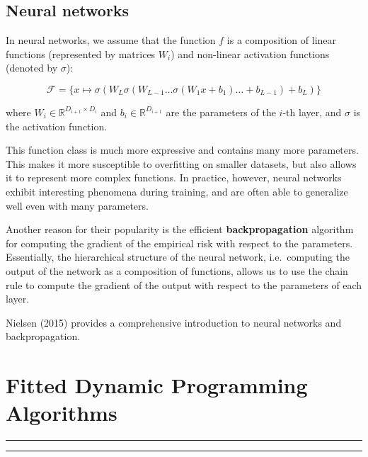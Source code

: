 \documentclass[
  letterpaper,
  DIV=11,
  numbers=noendperiod]{scrreprt}
\theoremstyle{plain}
\theoremstyle{plain}
\theoremstyle{definition}
\theoremstyle{definition}
\theoremstyle{remark}
\begin{document}
\section{Neural networks}\label{neural-networks}

In neural networks, we assume that the function \(f\) is a composition
of linear functions (represented by matrices \(W_i\)) and non-linear
activation functions (denoted by \(\sigma\)):

\[
\mathcal{F} = \{ x \mapsto \sigma(W_L \sigma(W_{L-1} \dots \sigma(W_1 x + b_1) \dots + b_{L-1}) + b_L) \}
\]

where \(W_i \in \mathbb{R}^{D_{i+1} \times D_i}\) and
\(b_i \in \mathbb{R}^{D_{i+1}}\) are the parameters of the \(i\)-th
layer, and \(\sigma\) is the activation function.

This function class is much more expressive and contains many more
parameters. This makes it more susceptible to overfitting on smaller
datasets, but also allows it to represent more complex functions. In
practice, however, neural networks exhibit interesting phenomena during
training, and are often able to generalize well even with many
parameters.

Another reason for their popularity is the efficient
\textbf{backpropagation} algorithm for computing the gradient of the
empirical risk with respect to the parameters. Essentially, the
hierarchical structure of the neural network, i.e.~computing the output
of the network as a composition of functions, allows us to use the chain
rule to compute the gradient of the output with respect to the
parameters of each layer.

Nielsen (2015) provides a comprehensive introduction to neural networks
and backpropagation.


\chapter{Fitted Dynamic Programming Algorithms}\label{sec-fitted_dp}

\begin{center}\rule{0.5\linewidth}{0.5pt}\end{center}

\begin{center}\rule{0.5\linewidth}{0.5pt}\end{center}

\providecommand{\hi}{h}
\providecommand{\hor}{H}
\providecommand{\kl}[2]{\mathrm{KL}\left(#1\parallel#2\right)}
\providecommand{\ind}[1]{\mathbf{1}\left\{#1\right\}}
\providecommand{\st}{s}
\providecommand{\act}{a}
\providecommand{\E}{\mathbb{E}}
\providecommand{\R}{\mathbb{R}}
\providecommand{\pr}{\mathbb{P}}
\end{document}
